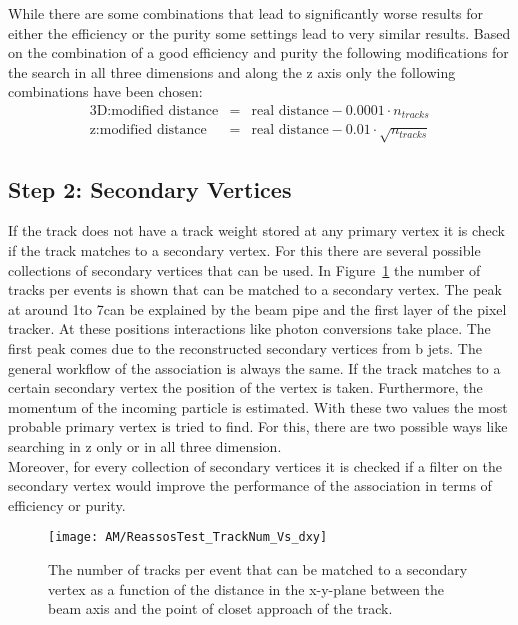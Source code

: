 While there are some combinations that lead to significantly worse results for either the efficiency or the purity some settings lead to very similar results. Based on the combination of a good efficiency and purity the following modifications for the search in all three dimensions and along the z axis only the following combinations have been chosen:
\begin{eqnarray}
\textrm{3D}: \textrm{modified distance} & = & \textrm{real distance} - 0.0001 \cdot n_{tracks} \label{eqn:AMWFCVweight3} \\
\textrm{z}: \textrm{modified distance} & = & \textrm{real distance} - 0.01 \cdot \sqrt{n_{tracks}} \label{eqn:AMWFCVweightz}
\end{eqnarray}

\subsection{Step 2: Secondary Vertices\label{sec:AMWFSV}}

If the track does not have a track weight stored at any primary vertex it is check if the track matches to a secondary vertex. For this there are several possible collections of secondary vertices that can be used. In Figure~\ref{plot:AMWFSVfrac} the number of tracks per events is shown that can be matched to a secondary vertex. The peak at around 1\cm to 7\cm can be explained by the beam pipe and the first layer of the pixel tracker. At these positions interactions like photon conversions take place. The first peak comes due to the reconstructed secondary vertices from b jets. The general workflow of the association is always the same. If the track matches to a certain secondary vertex the position of the vertex is taken. Furthermore, the momentum of the incoming particle is estimated. With these two values the most probable primary vertex is tried to find. For this, there are two possible ways like searching in z only or in all three dimension.\\
Moreover, for every collection of secondary vertices it is checked if a filter on the secondary vertex would improve the performance of the association in terms of efficiency or purity. 

\begin{figure}[!ht]
  \centering
  \texttt{[image: AM/ReassosTest\_TrackNum\_Vs\_dxy]}
  \caption[Number of tracks that can be matched to a secondary vertex]{The number of tracks per event that can be matched to a secondary vertex as a function of the distance in the x-y-plane between the beam axis and the point of closet approach of the track.\label{plot:AMWFSVfrac}}
\end{figure}

